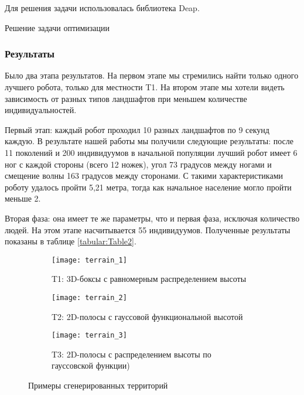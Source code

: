Для решения задачи использовалась библиотека Deap.

\begin{algorithm}[H]
\caption{Решение задачи оптимизации\label{high_level}}
\end{algorithm}

\subsubsection{Результаты}
Было два этапа результатов. На первом этапе мы стремились найти только одного лучшего робота, только для местности T1. На втором этапе мы хотели видеть зависимость от разных типов ландшафтов при меньшем количестве индивидуальностей.

Первый этап: каждый робот проходил 10 разных ландшафтов по 9 секунд каждую.
В результате нашей работы мы получили следующие результаты: после 11 поколений и 200 индивидуумов в начальной популяции лучший робот имеет 6 ног с каждой стороны (всего 12 ножек), угол 73 градусов между ногами и смещение волны 163 градусов между сторонами. С такими характеристиками роботу удалось пройти 5,21 метра, тогда как начальное население могло пройти меньше 2.

Вторая фаза: она имеет те же параметры, что и первая фаза, исключая количество людей. На этом этапе насчитывается 55 индивидуумов.
Полученные результаты показаны в таблице \cref{tabular:Table2}.
\begin{figure}[ht!]
    \begin{subfigure}{0.33\textwidth}
    \centering\texttt{[image: terrain\_1]} 
    \caption{T1: 3D-боксы с равномерным распределением высоты}
    \label{fig:terrain_1}
    \end{subfigure}
    \begin{subfigure}{0.33\textwidth}
    \centering\texttt{[image: terrain\_2]} 
    \caption{T2: 2D-полосы с гауссовой функциональной высотой}
    \label{fig:terrain_2}
    \end{subfigure}
    \begin{subfigure}{0.33\textwidth}
    \centering\texttt{[image: terrain\_3]}
    \caption{T3: 2D-полосы с распределением высоты по гауссовской функции)}
    \label{fig:terrain_3}
    \end{subfigure}
     
    \caption{Примеры сгенерированных территорий}
    \label{fig:terrains}
\end{figure}
\vspace{-0.5cm}

